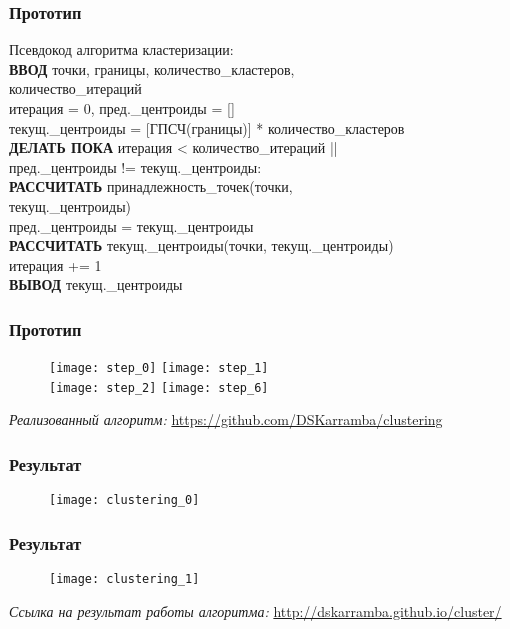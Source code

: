 \begin{frame} %
    \frametitle{Прототип}
    Псевдокод алгоритма кластеризации:\\
    \vspace{1em}
      \footnotesize
      \textbf{ВВОД} точки, границы, количество\_кластеров,\\
        \hspace{.15cm}количество\_итераций\\
      итерация = 0, пред.\_центроиды = []\\
      текущ.\_центроиды = [ГПСЧ(границы)] * количество\_кластеров\\
      \textbf{ДЕЛАТЬ ПОКА} итерация < количество\_итераций
        || \\ \hspace{.15cm} пред.\_центроиды != текущ.\_центроиды:\\
        \hspace{.5cm}\textbf{РАССЧИТАТЬ} принадлежность\_точек(точки,\\
          \hspace{.65cm} текущ.\_центроиды)\\
        \hspace{.5cm} пред.\_центроиды = текущ.\_центроиды\\
        \hspace{.5cm}\textbf{РАССЧИТАТЬ} текущ.\_центроиды(точки,
          текущ.\_центроиды)\\
        \hspace{.5cm} итерация += 1\\
      \textbf{ВЫВОД} текущ.\_центроиды
\end{frame}

\begin{frame} %
    \frametitle{Прототип}
    \begin{figure}
        \texttt{[image: step\_0]} \hfill
        \texttt{[image: step\_1]} \\
        \texttt{[image: step\_2]} \hfill
        \texttt{[image: step\_6]}
    \end{figure}
    \footnotesize\emph{Реализованный алгоритм:}
      \url{https://github.com/DSKarramba/clustering}\\
\end{frame}

\begin{frame} %
    \frametitle{Результат}
    \begin{figure}
        \center
        \texttt{[image: clustering\_0]}
    \end{figure}

    \vspace{5ex}
\end{frame}

\begin{frame} %
    \frametitle{Результат}
    \begin{figure}
        \center
        \texttt{[image: clustering\_1]}
    \end{figure}

    \footnotesize\emph{Ссылка на результат работы алгоритма:}
      \url{http://dskarramba.github.io/cluster/}
\end{frame}

